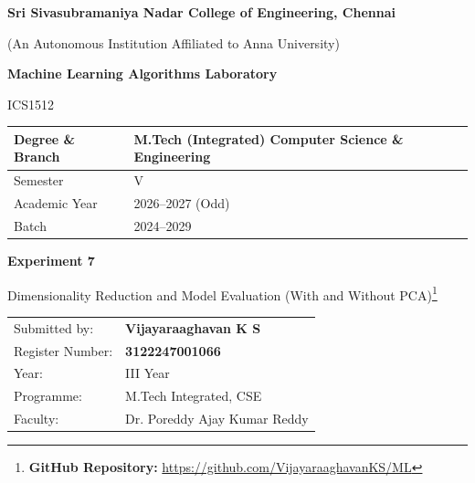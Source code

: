 \documentclass[11pt,a4paper]{article}
\title{}
\date{}
\begin{document}
\begin{titlepage}
\centering
\vspace*{1cm}
{\Large\bfseries Sri Sivasubramaniya Nadar College of Engineering, Chennai\par}
\vspace{0.2cm}
{\normalsize (An Autonomous Institution Affiliated to Anna University)\par}
\vspace{1.2cm}

{\Large\bfseries Machine Learning Algorithms Laboratory\par}
\vspace{0.3cm}
{\large ICS1512\par}
\vspace{1.5cm}

\begin{tabular}{|p{5.5cm}|p{7cm}|}
\hline
Degree \& Branch & M.Tech (Integrated) Computer Science \& Engineering \\
\hline
Semester & V \\
\hline
Academic Year & 2026--2027 (Odd) \\
\hline
Batch & 2024--2029 \\
\hline
\end{tabular}

\vspace{1.8cm}
{\Large\bfseries Experiment 7\par}
\vspace{0.3cm}
{\large Dimensionality Reduction and Model Evaluation (With and Without PCA)\footnote{\textbf{GitHub Repository: }\url{https://github.com/VijayaraaghavanKS/ML}}\par}
\vspace{2.5cm}

\begin{tabular}{ll}
Submitted by: & \textbf{Vijayaraaghavan K S} \\[4pt]
Register Number: & \textbf{3122247001066} \\[4pt]
Year: & III Year \\[4pt]
Programme: & M.Tech Integrated, CSE \\[4pt]
Faculty: & Dr. Poreddy Ajay Kumar Reddy \\[4pt]
\end{tabular}

\vfill
\end{titlepage}

\tableofcontents
\newpage
\end{document}
